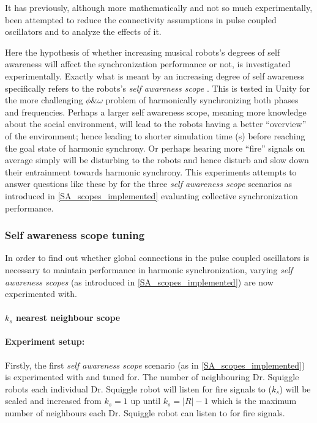 	It has previously, although more mathematically and not so much experimentally, been attempted to reduce the connectivity assumptions in pulse coupled oscillators \cite{minimally_connected_pcos} and to analyze the effects of it.
	
	Here the hypothesis of whether increasing musical robots's degrees of self awareness will affect the synchronization performance or not, is investigated experimentally. Exactly what is meant by an increasing degree of self awareness specifically refers to the robots's \textit{self awareness scope} \cite{sacs17_ch3}. This is tested in Unity for the more challenging $\phi \& \omega$ problem of harmonically synchronizing both phases and frequencies. Perhaps a larger self awareness scope, meaning more knowledge about the social environment, will lead to the robots having a better ``overview'' of the environment; hence leading to shorter simulation time (s) before reaching the goal state of harmonic synchrony. Or perhaps hearing more ``fire'' signals on average simply will be disturbing to the robots and hence disturb and slow down their entrainment towards harmonic synchrony. This experiments attempts to answer questions like these by for the three \textit{self awareness scope} scenarios as introduced in \ref{SA_scopes_implemented} evaluating collective synchronization performance.
	
	
		\subsubsection{Self awareness scope tuning}
		\label{phase_sync_SA_scopes_tuning}

		In order to find out whether global connections in the pulse coupled oscillators is necessary to maintain performance in harmonic synchronization, varying \textit{self awareness scopes} (as introduced in \ref{SA_scopes_implemented}) are now experimented with.
		
			\paragraph{$k_s$ nearest neighbour scope}
			
				\paragraph{Experiment setup:\nl}
				
				Firstly, the first \textit{self awareness scope} scenario (as in \ref{SA_scopes_implemented}) is experimented with and tuned for. The number of neighbouring Dr. Squiggle robots each individual Dr. Squiggle robot will listen for fire signals to ($k_s$) will be scaled and increased from $k_s=1$ up until $k_s=|R|-1$ which is the maximum number of neighbours each Dr. Squiggle robot can listen to for fire signals.

